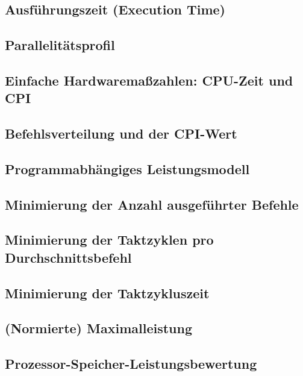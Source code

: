 \subsection{Ausführungszeit (Execution Time)}

\subsection{Parallelitätsprofil}

\subsection{Einfache Hardwaremaßzahlen:  CPU-Zeit und CPI}

\subsection{Befehlsverteilung und der CPI-Wert}

\subsection{Programmabhängiges Leistungsmodell}

\subsection{Minimierung der Anzahl ausgeführter Befehle}

\subsection{Minimierung der Taktzyklen pro Durchschnittsbefehl}

\subsection{Minimierung der Taktzykluszeit}

\subsection{(Normierte) Maximalleistung}

\subsection{Prozessor-Speicher-Leistungsbewertung}

